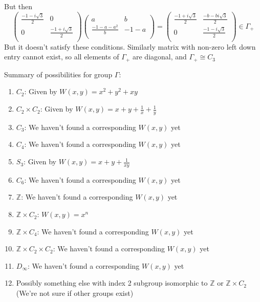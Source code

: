 \documentclass[a4paper]{article}
\begin{document}
But then 
$$\begin{pmatrix}
\frac{-1-i\sqrt{3}}{2} & 0 \\ 
0 &  \frac{-1+i\sqrt{3}}{2}\\
\end{pmatrix} \begin{pmatrix}
a & b \\ 
\frac{-1-a-a^2}{b} & -1-a \\
\end{pmatrix} = \begin{pmatrix}
\frac{-1+i\sqrt{3}}{2} & \frac{-b-b i\sqrt{3}}{2} \\ 
0 & \frac{-1-i\sqrt{3}}{2} \\
\end{pmatrix} \in \Gamma_+$$
But it doesn't satisfy these conditions.
Similarly matrix with non-zero left down entry cannot exist, so all elements of $\Gamma_+$ are diagonal, and $\Gamma_+ \cong C_3$

 
Summary of possibilities for group $\Gamma$:
\begin{enumerate}
	\item $C_2$: Given by $W(x,y) = x^2 + y^2+ x y$ 
	\item $C_2 \times C_2$: Given by $W(x,y) = x+ y +\frac{1}{x}+\frac{1}{y}$
	\item $C_3$: We haven't found a corresponding $W(x,y)$ yet
	\item $C_4$: We haven't found a corresponding $W(x,y)$ yet
	\item $S_3$: Given by $W(x,y) = x + y +\frac{1}{xy}$
	\item $C_6$: We haven't found a corresponding $W(x,y)$ yet
	\item $\mathbb{Z}$: We haven't found a corresponding $W(x,y)$ yet
	\item $\mathbb{Z} \times C_2$: $W(x,y) = x^n$
	\item $\mathbb{Z} \times C_4$: We haven't found a corresponding $W(x,y)$ yet
	\item $\mathbb{Z} \times C_2 \times C_2$: We haven't found a corresponding $W(x,y)$ yet
	\item $D_\infty$: We haven't found a corresponding $W(x,y)$ yet
	\item Possibly something else with index 2 subgroup isomorphic to $\mathbb{Z}$ or $\mathbb{Z} \times C_2$(We're not sure if other groups exist)
\end{enumerate}
\end{document}
